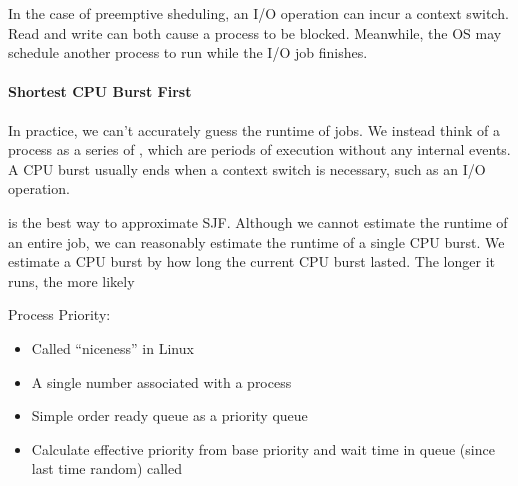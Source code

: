 In the case of preemptive sheduling, an I/O operation can incur a context switch. Read and write can both cause a process to be blocked. Meanwhile, the OS may schedule another process to run while the I/O job finishes. 


\paragraph{Shortest CPU Burst First}
In practice, we can't accurately guess the runtime of jobs. We instead think of a process as a series of , which are periods of execution without any internal events. A CPU burst usually ends when a context switch is necessary, such as an I/O operation. 


 is the best way to approximate SJF. Although we cannot estimate the runtime of an entire job, we can reasonably estimate the runtime of a single CPU burst. We estimate a CPU burst by how long the current CPU burst lasted. The longer it runs, the more likely 

Process Priority:
\begin{itemize}
    \item Called ``niceness'' in Linux
    \item A single number associated with a process
    \item Simple order ready queue as a priority queue
    \item Calculate effective priority from base priority and wait time in queue (since last time random) called 
\end{itemize}

